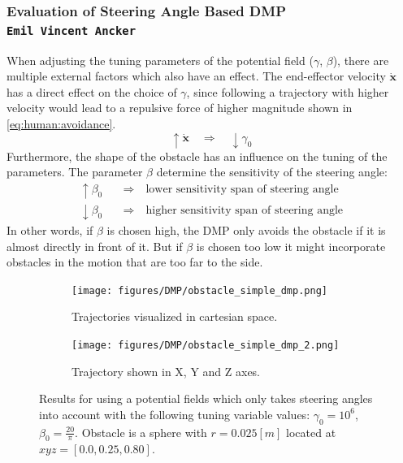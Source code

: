 \documentclass[../main.tex]{subfiles}
\begin{document}
\subsubsection{Evaluation of Steering Angle Based DMP \\ \normalfont\normalsize\texttt{Emil Vincent Ancker}} \label{subsubsec:eval:steering:dmp}
When adjusting the tuning parameters of the potential field ($\gamma$, $\beta$), there are multiple external factors which also have an effect. The end-effector velocity $\dot{\boldsymbol{x}}$ has a direct effect on the choice of $\gamma$, since following a trajectory with higher velocity would lead to a repulsive force of higher magnitude shown in \autoref{eq:human:avoidance}.
\begin{equation}
    \uparrow \dot{\boldsymbol{x}} \quad \Rightarrow \quad \downarrow \gamma_0
\end{equation}
Furthermore, the shape of the obstacle has an influence on the tuning of the parameters. The parameter $\beta$ determine the sensitivity of the steering angle:
\begin{align}
    \uparrow \beta_0 \quad &\Rightarrow \quad \text{lower sensitivity span of steering angle} \\
    \downarrow \beta_0 \quad &\Rightarrow \quad \text{higher sensitivity span of steering angle}
\end{align}
In other words, if $\beta$ is chosen high, the DMP only avoids the obstacle if it is almost directly in front of it. But if $\beta$ is chosen too low it might incorporate obstacles in the motion that are too far to the side.

\begin{figure}[H]
    \centering
    \begin{subfigure}[b]{0.48\textwidth}
        \centering
        \texttt{[image: figures/DMP/obstacle\_simple\_dmp.png]}
        \caption{Trajectories visualized in cartesian space.}
        \label{fig:dmp:obstacle:simple:1}
    \end{subfigure}
    \hfill
    \begin{subfigure}[b]{0.48\textwidth}
        \centering
        \texttt{[image: figures/DMP/obstacle\_simple\_dmp\_2.png]}
        \caption{Trajectory shown in X, Y and Z axes.}
        \label{fig:dmp:obstacle:simple:2}
    \end{subfigure}
    \caption{Results for using a potential fields which only takes steering angles into account with the following tuning variable values: $\gamma_0 = 10^6$, $\beta_0 = \frac{20}{\pi}$. Obstacle is a sphere with $r=0.025[m]$ located at  $xyz=[0.0, 0.25, 0.80]$.}
    \label{fig:dmp:obstacle:simple}
\end{figure}
\end{document}
